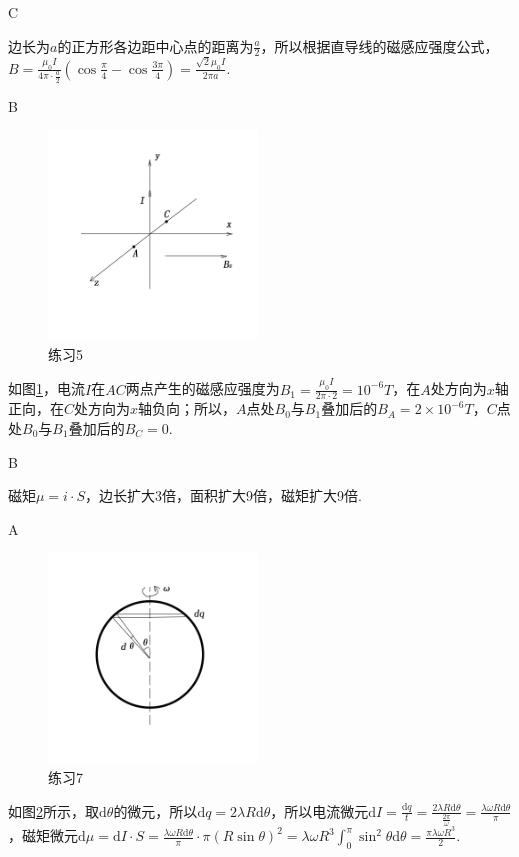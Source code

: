\documentclass[b5paper,opensource,sourcefont,parskip]{qyxf-book}
\newcommand{\di}[1]{\mathrm{d}#1}
\begin{document}
C

\solve
边长为$a$的正方形各边距中心点的距离为$\frac{a}{2}$，所以根据直导线的磁感应强度公式，$B=\frac{\mu_0I}{4\pi\cdot\frac{a}{2}}(\cos\frac{\pi}{4}-\cos\frac{3\pi}{4})=\frac{\sqrt{2}\mu_0I}{2\pi a}$.

B

\begin{figure}[htbp]  %
	\centering
	\includegraphics[width=15em, height=15em]{Chp8_illus1.jpg}
	\caption{练习5}
	\label{fig:c1}
\end{figure}

\solve
如图\ref{fig:c1}，电流$I$在$AC$两点产生的磁感应强度为$B_1=\frac{\mu_0I}{2\pi\cdot2}=10^{-6}T$，在$A$处方向为$x$轴正向，在$C$处方向为$x$轴负向；所以，$A$点处$B_0$与$B_1$叠加后的$B_A=2\times10^{-6}T$，$C$点处$B_0$与$B_1$叠加后的$B_C=0$.

B

\solve
磁矩$\mu=i\cdot S$，边长扩大3倍，面积扩大9倍，磁矩扩大9倍.

A

\begin{figure}[htbp]  %
	\centering
	\includegraphics[width=15em, height=15em]{Chp8_illus2.jpg}
	\caption{练习7}
	\label{fig:c2}
\end{figure}

\solve
如图\ref{fig:c2}所示，取$\di\theta$的微元，所以$\di q=2\lambda R\di\theta$，所以电流微元$\di I=\frac{\di q}{t}=\frac{2\lambda R\di\theta}{\frac{2\pi}{\omega}}=\frac{\lambda\omega R\di\theta}{\pi}$，磁矩微元$\di\mu=\di I\cdot S=\frac{\lambda\omega R\di\theta}{\pi}\cdot\pi(R\sin\theta)^2=\lambda\omega R^3\int_0^\pi\sin^2\theta\di\theta=\frac{\pi\lambda\omega R^3}{2}$.
\end{document}
